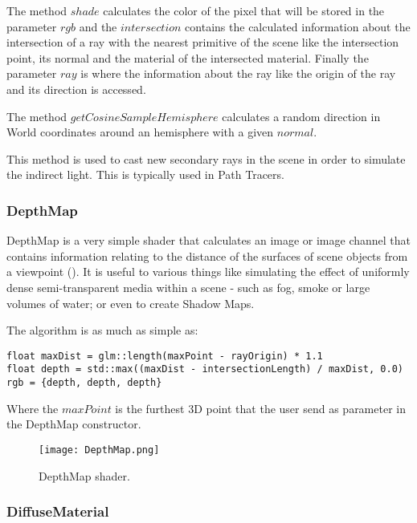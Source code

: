 \par
The method
$shade$
calculates the color of the pixel that will be stored in the parameter
$rgb$
and the
$intersection$
contains the calculated information about the intersection of a ray with the nearest primitive of the scene like the intersection point, its normal and the material of the intersected material.
Finally the parameter
$ray$
is where the information about the ray like the origin of the ray and its direction is accessed.

\par
The method
$getCosineSampleHemisphere$
calculates a random direction in World coordinates around an hemisphere with a given
$normal$.

This method is used to cast new secondary rays in the scene in order to simulate the indirect light.
This is typically used in Path Tracers.

\subsubsection{DepthMap}

\par
DepthMap is a very simple shader that calculates an image or image channel that contains information relating to the distance of the surfaces of scene objects from a viewpoint (\cite{DepthMap}).
It is useful to various things like simulating the effect of uniformly dense semi-transparent media within a scene - such as fog, smoke or large volumes of water; or even to create Shadow Maps.

The algorithm is as much as simple as:

\begin{lstlisting}[caption={Algorithm of DepthMap Shader}, captionpos=b, label=DepthMap]
float maxDist = glm::length(maxPoint - rayOrigin) * 1.1
float depth = std::max((maxDist - intersectionLength) / maxDist, 0.0)
rgb = {depth, depth, depth}
\end{lstlisting}

Where the
$maxPoint$
is the furthest 3D point that the user send as parameter in the DepthMap constructor.

\begin{figure}[H]
	\centering
	\caption{DepthMap shader.}
	\label{DepthMap shader.}
	\texttt{[image: DepthMap.png]}
\end{figure}


\subsubsection{DiffuseMaterial}

